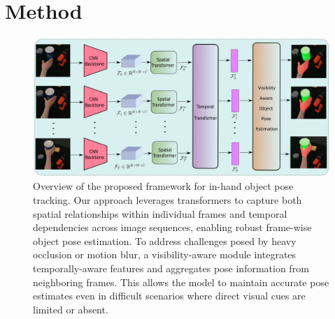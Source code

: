 \section{Method}

\begin{figure}[h!]
	\centering
	\includegraphics[width=0.98\linewidth]{figs/overview}
	\caption{Overview of the proposed framework for in-hand object pose tracking. Our approach leverages transformers to capture both spatial relationships within individual frames and temporal dependencies across image sequences, enabling robust frame-wise object pose estimation. To address challenges posed by heavy occlusion or motion blur, a visibility-aware module integrates temporally-aware features and aggregates pose information from neighboring frames. This allows the model to maintain accurate pose estimates even in difficult scenarios where direct visual cues are limited or absent.}
	\label{fig:overview}
\end{figure}

